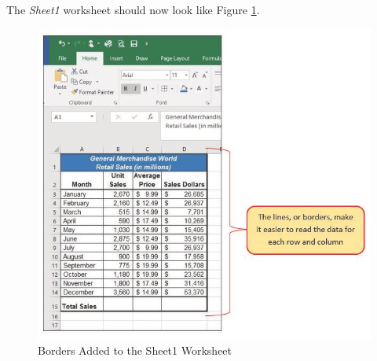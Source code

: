 The \textit{Sheet1} worksheet should now look like Figure \ref{01:fig44}.

\begin{figure}[H]
	\centering
	\includegraphics[width=\maxwidth{.95\linewidth}]{gfx/ch01_fig44}
	\caption{Borders Added to the Sheet1 Worksheet}
	\label{01:fig44}
\end{figure}

